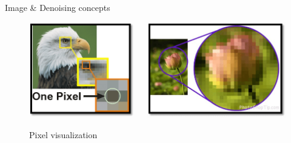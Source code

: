 \documentclass{beamer}
\begin{document}
\begin{frame}[t]{Image \& Denoising concepts}
    \vspace{20pt}
    \begin{figure}
        \begin{columns}[onlytextwidth]
            \begin{column}{0.45\textwidth}
                \centering
                \includegraphics[width=\linewidth]{img/concept-of-pixel1.png}
               
                \label{fig:sub1}
            \end{column}
            \begin{column}{0.45\textwidth}
                \centering
                \includegraphics[width=\linewidth]{img/concept-of-pixel2.png}
               
                \label{fig:sub2}
            \end{column}
        \end{columns}
        \caption{Pixel visualization}
        \label{fig:images}
    \end{figure}
\end{frame}
\end{document}
